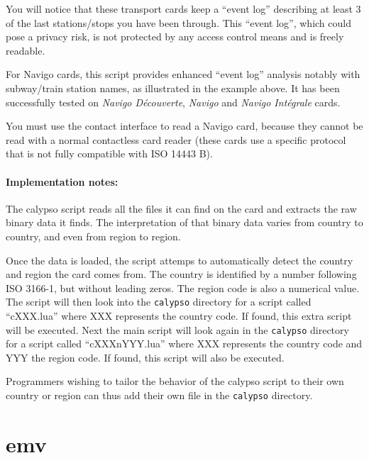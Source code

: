 \documentclass[11pt]{report}
\begin{document}
You will notice that these transport cards keep a ``event log'' describing at 
least 3 of the last stations/stops you have been through.
This ``event log'', which could pose a privacy risk, is not protected by any access 
control means and is freely readable.

For Navigo cards, this script provides enhanced ``event log'' analysis notably with 
subway/train station names, as illustrated in the example above.
It has been successfully tested on \emph{Navigo D\'ecouverte}, \emph{Navigo} and 
\emph{Navigo Int\'egrale} cards.

You must use the contact interface to read a Navigo card, because they cannot be read with a normal contactless 
card reader (these cards use a specific protocol that is not fully compatible with ISO 14443 B).

\paragraph{Implementation notes:}
The calypso script reads all the files it can find on the card and extracts the raw
binary data it finds. 
The interpretation of that binary data varies from country to country, and even from
region to region.

Once the data is loaded, the script attemps to automatically detect the country and 
region the card comes from.
The country is identified by a number following ISO 3166-1, but without leading zeros.
The region code is also a numerical value. 
The script will then look into the \texttt{calypso} directory for a script called ``cXXX.lua'' where
XXX represents the country code. If found, this extra script will be executed. Next
the main script will look again in the \texttt{calypso} directory for a script called 
``cXXXnYYY.lua'' where XXX represents the country code and YYY the region code.
If found, this script will also be executed.

Programmers wishing to tailor the behavior of the calypso script to their own
country or region can thus add their own file in the \texttt{calypso} directory.

\section{emv}
\end{document}
